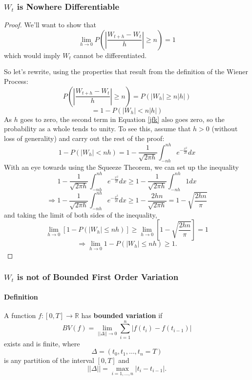 \documentclass[12pt]{article}
\theoremstyle{plain}
\theoremstyle{definition}
\theoremstyle{remark}
\begin{document}
\subsubsection{$W_t$ is Nowhere Differentiable}
      \begin{proof}
	 We'll want to show that
	    \[\lim_{h \rightarrow 0} P\left( \left\lvert
	       \frac{W_{t+h} - W_t}{h} \right\rvert \geq n \right) =1 \]
	 which would imply $W_t$ cannot be differentiated.

	 So let's rewrite, using the properties that result from the
	 definition of the Wiener Process:
	    \[ P\left( \left\lvert \frac{W_{t+h} - W_t}{h}
	       \right\rvert \geq n \right) = P(|W_h| \geq n|h|) \]
	 \begin{equation}
	    \label{jfk}
	     = 1 - P(|W_h| < n|h|)
	 \end{equation}
	 As $h$ goes to zero, the second term in Equation \ref{jfk} also
	 goes zero, so the probability as a whole tends to unity.  To
	 see this, assume that $h>0$ (without loss of generality) and
	 carry out the rest of the proof:
	 \[ 1- P(|W_h| < nh) = 1- \frac{1}{\sqrt{2\pi h}} \int^{nh}_{-nh}
	    e^{-\frac{x^2}{2t}} dx \]
	 With an eye towards using the Squeeze Theorem, we can set up
	 the inequality
	    \[   1- \frac{1}{\sqrt{2\pi h}} \int^{nh}_{-nh}
	       e^{-\frac{x^2}{2t}} dx \geq 1 - \frac{1}{\sqrt{2\pi h}}
	       \int^{nh}_{-nh} 1 dx \]
	    \[ \Rightarrow  1- \frac{1}{\sqrt{2\pi h}} \int^{nh}_{-nh}
	       e^{-\frac{x^2}{2t}} dx \geq 1 -\frac{2hn}{ \sqrt{2\pi h}}
	       = 1 - \sqrt{\frac{2hn}{\pi}} \]
	 and taking the limit of both sides of the inequality,
	 \[ \lim_{h\rightarrow 0}\left[1 - P(|W_h| \leq nh) \right] \geq
	    \lim_{h\rightarrow 0} \left[ 1-\sqrt{\frac{2hn}{\pi}}\right]
	    = 1 \]
	 \[ \Rightarrow \lim_{h\rightarrow 0} 1 - P(|W_h| \leq nh)
	    \geq 1.\]
	 \end{proof}


\subsubsection{$W_t$ is not of Bounded First Order Variation}

      \paragraph{Definition} A function $f: [0,T] \rightarrow \mathbb{R}$
      has \textbf{bounded variation} if
	 \[ BV(f) = \lim_{||\Delta|| \rightarrow 0}\sum_{i=1}^n|f(t_i)-
	    f(t_{i-1})| \]
      exists and is finite, where
	 \[ \Delta = (t_0, t_1, \ldots , t_n = T) \]
      is any partition of the interval $[0,T]$ and
	 \[ || \Delta || = \max_{i = 1, \ldots, n} |t_i - t_{i-1}|. \]
\end{document}
